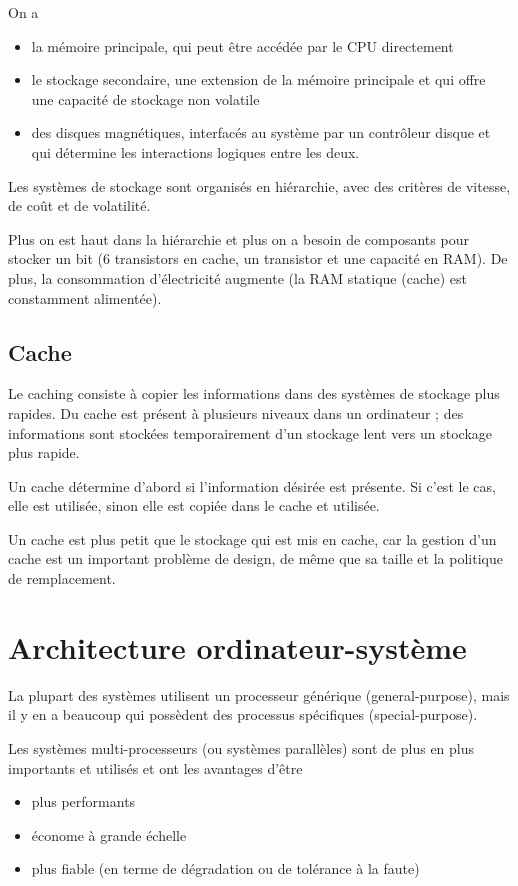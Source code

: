	On a
	
	\begin{itemize}
		\item la mémoire principale, qui peut être accédée par le CPU directement
		\item le stockage secondaire, une extension de la mémoire principale et qui offre une capacité de stockage non volatile
		\item des disques magnétiques, interfacés au système par un contrôleur disque et qui détermine les interactions logiques entre les deux.
	\end{itemize}
	
	Les systèmes de stockage sont organisés en hiérarchie, avec des critères de vitesse, de coût et de volatilité.
		
	
	Plus on est haut dans la hiérarchie et plus on a besoin de composants pour stocker un bit (6 transistors en cache, un transistor et une capacité en RAM). De plus, la consommation d'électricité augmente (la RAM statique (cache) est constamment alimentée).
	
		\subsection{Cache}
		
		Le caching consiste à copier les informations dans des systèmes de stockage plus rapides. Du cache est présent à plusieurs niveaux dans un ordinateur ; des informations sont stockées temporairement d'un stockage lent vers un stockage plus rapide.
		
		Un cache détermine d'abord si l'information désirée est présente. Si c'est le cas, elle est utilisée, sinon elle est copiée dans le cache et utilisée.
		
		Un cache est plus petit que le stockage qui est mis en cache, car la gestion d'un cache est un important problème de design, de même que sa taille et la politique de remplacement.
		
	\section{Architecture ordinateur-système}
	
	La plupart des systèmes utilisent un processeur générique (general-purpose), mais il y en a beaucoup qui possèdent des processus spécifiques (special-purpose).
	
	Les systèmes multi-processeurs (ou systèmes parallèles) sont de plus en plus importants et utilisés et ont les avantages d'être
	\begin{itemize}
		\item plus performants
		\item économe à grande échelle
		\item plus fiable (en terme de dégradation ou de tolérance à la faute)
	\end{itemize}
	
